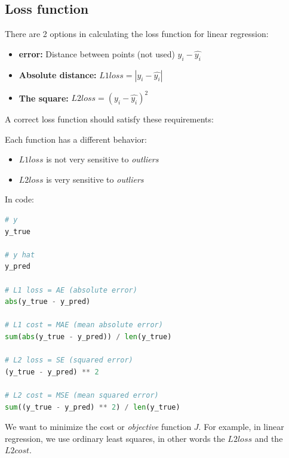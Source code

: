 \subsection{Loss function}

\par
There are 2 options in calculating the loss function for linear regression:

\begin{itemize}
	\item \textbf{error:} Distance between points (not used) $y_i-\hat{y_i}$
	\item \textbf{Absolute distance:} $L1 loss = |y_i-\hat{y_i}|$
	\item \textbf{The square:} $L2 loss = (y_i-\hat{y_i})^2$
\end{itemize}

\par
A correct loss function should satisfy these requirements:


Each function has a different behavior:

\begin{itemize}
	\item $L1 loss$ is not very sensitive to \textit{outliers}
	\item $L2 loss$ is very sensitive to \textit{outliers}
\end{itemize}

In code:

\begin{lstlisting}[language=Python, caption=Loss functions]
# y
y_true

# y hat
y_pred

# L1 loss = AE (absolute error)
abs(y_true - y_pred)

# L1 cost = MAE (mean absolute error)
sum(abs(y_true - y_pred)) / len(y_true)

# L2 loss = SE (squared error)
(y_true - y_pred) ** 2

# L2 cost = MSE (mean squared error)
sum((y_true - y_pred) ** 2) / len(y_true)
\end{lstlisting}

\par
We want to minimize the cost or \textit{objective} function $J$. For example, in
linear regression, we use ordinary least squares, in other words the $L2 loss$
and the $L2 cost$.


